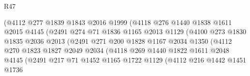 \begin{lexlean}{R47}
\begin{coremodule}
                              (@4112
                                @277
                                @1839
                                @1843
                                @2016
                                @1999
                                (@4118
                                  @276
                                  @1440
                                  @1838
                                  @1611
                                  @2015
                                  @4145
                                  (@2491
                                    @274
                                    @71
                                    @1836
                                    @1165
                                    @2013
                                    @1129
                                    (@4100
                                      @273
                                      @1830
                                      @1835
                                      @2036
                                      @2013
                                      (@2491
                                        @271
                                        @200
                                        @1828
                                        @1167
                                        @2034
                                        @1350
                                        (@4112
                                          @270
                                          @1823
                                          @1827
                                          @2049
                                          @2034
                                          (@4118
                                            @269
                                            @1440
                                            @1822
                                            @1611
                                            @2048
                                            @4145
                                            (@2491
                                              @217
                                              @71
                                              @1452
                                              @1165
                                              @1722
                                              @1129
                                              (@4112
                                                @216
                                                @1442
                                                @1451
                                                @1736

\end{coremodule}
\end{lexlean}

